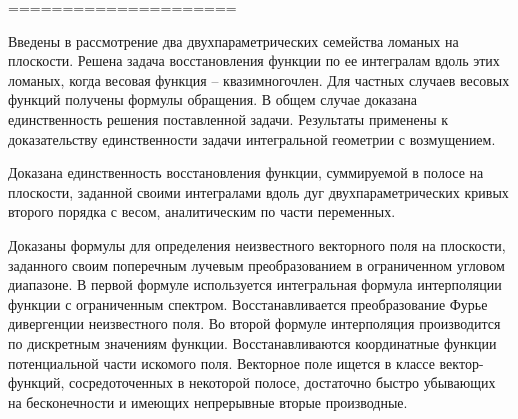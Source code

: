 =====================







Введены в рассмотрение два двухпараметрических семейства ломаных на плоскости. Решена задача восстановления функции по ее интегралам вдоль этих ломаных, когда весовая функция – квазимногочлен. Для частных случаев весовых функций получены формулы обращения. В общем случае доказана единственность решения поставленной задачи. Результаты применены к доказательству единственности задачи интегральной геометрии с возмущением.


Доказана единственность восстановления функции, суммируемой в полосе на плоскости, заданной своими интегралами вдоль дуг двухпараметрических кривых второго порядка с весом, аналитическим по части переменных.

Доказаны формулы для определения неизвестного векторного поля на плоскости, заданного своим поперечным лучевым преобразованием в ограниченном угловом диапазоне. В первой формуле используется интегральная формула интерполяции функции с ограниченным спектром. Восстанавливается преобразование Фурье дивергенции неизвестного поля. Во второй формуле интерполяция производится по дискретным значениям функции. Восстанавливаются координатные функции потенциальной части искомого поля. Векторное поле ищется в классе вектор-функций, сосредоточенных в некоторой полосе, достаточно быстро убывающих на бесконечности и имеющих непрерывные вторые производные.


